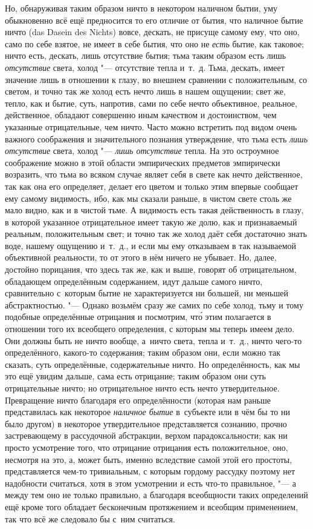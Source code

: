 Но, обнаруживая таким образом ничто в некотором наличном бытии, уму обыкновенно
всё ещё предносится то его отличие от бытия, что наличное бытие ничто (das
Dasein des Nichts) вовсе, дескать, не присуще самому ему, что оно, само по себе
взятое, не имеет в себе бытия, что оно не {\em есть} бытие, как таковое; ничто
есть, дескать, лишь отсутствие бытия; тьма таким образом есть лишь
{\em отсутствие} света, холод "--- отсутствие тепла и~т.~д. Тьма, дескать,
имеет значение лишь в отношении к глазу, во внешнем сравнении с положительным,
со светом, и точно так же холод есть нечто лишь в нашем ощущении; свет же,
тепло, как и бытие, суть, напротив, сами по себе нечто объективное, реальное,
действенное, обладают совершенно иным качеством и достоинством, чем указанные
отрицательные, чем ничто. Часто можно встретить под видом очень важного
соображения и значительного познания утверждение, что тьма есть
{\em лишь отсутствие} света, холод "--- {\em лишь отсутствие} тепла. На это
остроумное соображение можно в этой области эмпирических предметов эмпирически
возразить, что тьма во всяком случае являет себя в свете как нечто действенное,
так как она его определяет, делает его цветом и только этим впервые сообщает
ему самому видимость, ибо, как мы сказали раньше, в чистом свете столь же мало
видно, как и в чистой тьме. А видимость есть такая действенность в глазу, в
которой указанное отрицательное имеет такую же долю, как и признаваемый
реальным, положительным свет; и точно так же холод даёт себя достаточно знать
воде, нашему ощущению и~т.~д., и если мы ему отказываем в так называемой
объективной реальности, то от этого в нём ничего не убывает. Но, далее,
достойно порицания, что здесь так же, как и выше, говорят об отрицательном,
обладающем определённым содержанием, идут дальше самого ничто, сравнительно
с~которым бытие не характеризуется ни большей, ни меньшей абстрактностью. "---
Однако возьмём сразу же самих по себе холод, тьму и тому подобные определённые
отрицания и посмотрим, чт\'{о} этим полагается в отношении того их всеобщего
определения, с которым мы теперь имеем дело. Они должны быть не ничто вообще,
а~ничто света, тепла и~т.~д., ничто чего-то определённого, какого-то
содержания; таким образом они, если можно так сказать, суть определённые,
содержательные ничто. Но определённость, как мы это ещё увидим дальше, сама
есть отрицание; таким образом они суть отрицательные ничто; но отрицательное
ничто есть нечто утвердительное. Превращение ничто благодаря его определённости
(которая нам раньше представилась как некоторое {\em наличное бытие} в~субъекте
или в чём бы то ни было другом) в некоторое утвердительное представляется
сознанию, прочно застревающему в рассудочной абстракции, верхом
парадоксальности; как ни просто усмотрение того, что отрицание отрицания есть
положительное, оно, несмотря на это, а, может быть, именно вследствие самой
этой его простоты, представляется чем-то тривиальным, с которым гордому
рассудку поэтому нет надобности считаться, хотя в этом усмотрении и есть что-то
правильное, "--- а между тем оно не только правильно, а благодаря всеобщности
таких определений ещё кроме того обладает бесконечным протяжением и всеобщим
применением, так что всё же следовало бы с~ним считаться.

